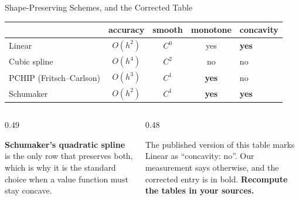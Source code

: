 \begin{frame}{Shape-Preserving Schemes, and the Corrected Table}
\renewcommand{\arraystretch}{1.2}
\begin{center}\footnotesize
\begin{tabularx}{\linewidth}{@{}>{\raggedright\arraybackslash}p{2.6cm} c c c >{\raggedright\arraybackslash}X@{}}
\toprule
 & \textbf{accuracy} & \textbf{smooth} & \textbf{monotone} & \textbf{concavity} \\
\midrule
Linear & $O(h^{2})$ & $C^{0}$ & yes & \textbf{yes} \\
Cubic spline & $O(h^{4})$ & $C^{2}$ & no & no \\
PCHIP (Fritsch--Carlson) & $O(h^{3})$ & $C^{1}$ & \textbf{yes} & no \\
Schumaker & $O(h^{2})$ & $C^{1}$ & \textbf{yes} & \textbf{yes} \\
\bottomrule
\end{tabularx}
\end{center}
\vspace{1mm}
\begin{columns}[T]
\begin{column}{0.49\textwidth}
\begin{takeawaybox}\small
\textbf{Schumaker's quadratic spline} is the only row that preserves both, which is why it is the standard choice when a value function must stay concave.
\end{takeawaybox}
\end{column}
\begin{column}{0.48\textwidth}
\begin{cautionbox}\footnotesize
The published version of this table marks Linear as ``concavity: no''. Our measurement says otherwise, and the corrected entry is in bold. \textbf{Recompute the tables in your sources.}
\end{cautionbox}
\end{column}
\end{columns}
\vspace{1mm}
\end{frame}

